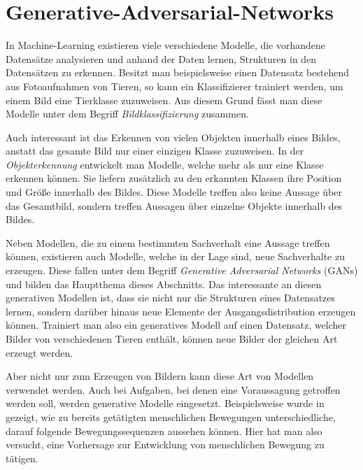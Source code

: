 \section{Generative-Adversarial-Networks}\label{chapter:gans}
In Machine-Learning existieren viele verschiedene Modelle, die vorhandene
Datensätze analysieren und anhand der Daten lernen, Strukturen in den
Datensätzen zu erkennen.  Besitzt man beispielsweise einen Datensatz
bestehend aus Fotoaufnahmen von Tieren, so kann ein Klassifizierer trainiert
werden, um einem Bild eine Tierklasse zuzuweisen. Aus diesem Grund fässt man
diese Modelle unter dem Begriff \textit{Bildklassifizierung} zusammen.

Auch interessant ist das Erkennen von vielen Objekten innerhalb eines
Bildes, anstatt das gesamte Bild nur einer einzigen Klasse zuzuweisen. In der
\textit{Objekterkennung} entwickelt man Modelle, welche mehr als nur eine
Klasse erkennen können. Sie liefern zusätzlich zu den erkannten Klassen ihre
Position und Größe innerhalb des Bildes. Diese Modelle treffen also keine
Aussage über das Gesamtbild, sondern treffen Aussagen über einzelne Objekte
innerhalb des Bildes.

Neben Modellen, die zu einem bestimmten Sachverhalt eine Aussage treffen
können, existieren auch Modelle, welche in der Lage sind, neue Sachverhalte zu
erzeugen. Diese fallen unter dem Begriff \textit{Generative Adversarial
Networks} (GANs) und bilden das Hauptthema dieses Abschnitts. Das interessante
an diesen generativen Modellen ist, dass sie nicht nur die Strukturen eines
Datensatzes lernen, sondern darüber hinaus neue Elemente der
Ausgangsdistribution erzeugen können. Trainiert man also ein generatives
Modell auf einen Datensatz, welcher Bilder von verschiedenen Tieren enthält,
können neue Bilder der gleichen Art erzeugt werden.

Aber nicht nur zum Erzeugen von Bildern kann diese Art von Modellen verwendet
werden. Auch bei Aufgaben, bei denen eine Voraussagung getroffen werden soll,
werden generative Modelle eingesetzt. Beispielsweise wurde in
\cite{barsoum2017hpgan} gezeigt, wie zu bereits getätigten menschlichen
Bewegungen unterschiedliche, darauf folgende Bewegungssequenzen aussehen
können. Hier hat man also versucht, eine Vorhersage zur Entwicklung von
menschlichen Bewegung zu tätigen.

